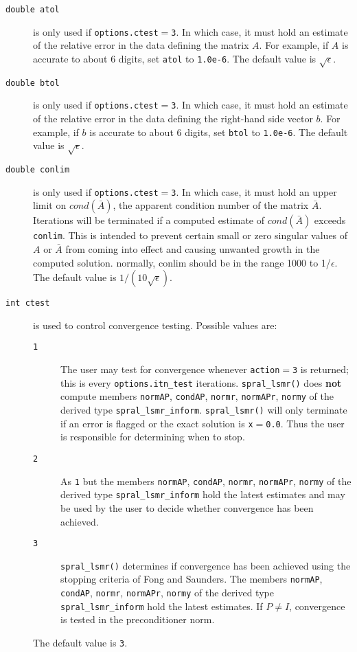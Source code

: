 \begin{description}

\item[\texttt{double atol}] is only used if
   {\tt options.ctest}$ =${\tt 3}.
   In which case, it must hold an estimate of the relative error in the data
   defining the matrix $A$.  For example, if $A$ is accurate to about 6 digits,
   set {\tt atol} to {\tt 1.0e-6}. The default value is $\sqrt{\epsilon}$.

\item[\texttt{double btol}] is only used if
   {\tt options.ctest}$ =${\tt 3}.
   In which case, it must hold an estimate of the relative error in the data
   defining the right-hand side vector $b$.  For example, if $b$ is
   accurate to about 6 digits, set {\tt btol} to {\tt 1.0e-6}. The default value
   is $\sqrt{\epsilon}$.


\item[\texttt{double conlim}] is only used if
   {\tt options.ctest}$ =${\tt 3}.
   In which case, it must hold an upper limit on $cond(\bar{A})$, the apparent
   condition number of the matrix $\bar{A}$. Iterations will be terminated 
   if a computed estimate of $cond(\bar{A})$ exceeds {\tt conlim}.
   This is intended to prevent certain small or
   zero singular values of $A$ or $\bar{A}$ from
   coming into effect and causing unwanted growth in the computed solution.
   normally, conlim should be in the range 1000 to 1/$\epsilon$.
   The default value is $1/(10\sqrt{\epsilon})$.

\item[\texttt{int ctest}] is used to control
   convergence testing. Possible values are:
   \begin{description}
   \item[\texttt{1}] The user may test for convergence whenever 
      {\tt action}$ = ${\tt 3} is returned; this is
      every {\tt options.itn\_test} iterations.
      {\tt spral\_lsmr()} does {\bf not} compute members
      {\tt normAP}, {\tt condAP}, {\tt normr}, {\tt normAPr}, {\tt normy}
      of the derived type {\tt spral\_lsmr\_inform}.
      {\tt spral\_lsmr()} will only terminate if an  error is flagged
      or the exact solution is {\tt x}$ = ${\tt 0.0}.
      Thus the user is responsible for determining when to stop.
   \item[\texttt{2}] As {\texttt 1} but the members
      {\tt normAP}, {\tt condAP}, {\tt normr}, {\tt normAPr}, {\tt normy}
      of the derived type {\tt spral\_lsmr\_inform} hold the latest estimates and
      may be used by the user to decide whether convergence has been achieved.
   \item[\texttt{3}] {\tt spral\_lsmr()} determines if convergence has been achieved
      using the stopping criteria of Fong and Saunders. The members
      {\tt normAP}, {\tt condAP}, {\tt normr}, {\tt normAPr}, {\tt normy}
      of the derived type {\tt spral\_lsmr\_inform} hold the latest estimates.
      If $P \neq I$,  convergence is tested in the
      preconditioner norm.
   \end{description}
   The default value is {\tt 3}.


\end{description}
